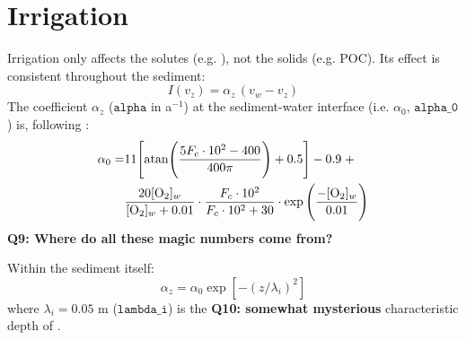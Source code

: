 \documentclass[a4paper]{article}
\newcommand{\code}[1]{\texttt{#1}}
\newcommand{\wtf}[1]{\textcolor{Cerulean}{\textbf{#1}}}
\begin{document}

\section{Irrigation}\label{sx:irrigation}

Irrigation only affects the solutes (e.g. ), not the solids (e.g. POC). Its effect is consistent throughout the sediment:
\begin{equation}
I(v_z) = \alpha_z \, (v_w - v_z)
\end{equation}
The coefficient $\alpha_z$ ($\code{alpha}$ in a$^{-1}$) at the sediment-water interface (i.e. $\alpha_0$, $\code{alpha\_0}$) is, following \citet{archer_model_2002}:
\begin{equation}
\begin{split}
\alpha_0 = & 11 \Bigg[ \mathrm{atan} \Bigg( \frac{5 F_c \cdot 10^2 - 400}{400 \pi} \Bigg) + 0.5 \Bigg] - 0.9 \; + \\
& \frac{20 [\ce{O2}]_w}{[\ce{O2}]_w + 0.01} \cdot \frac{F_c \cdot 10^2}{F_c \cdot 10^2 + 30} \cdot \exp \Bigg(\frac{-[\ce{O2}]_w}{0.01}\Bigg)
\end{split}
\end{equation}
\wtf{Q9: Where do all these magic numbers come from?}

Within the sediment itself:
\begin{equation}
\alpha_z = \alpha_0 \exp [-(z/\lambda_i)^2]
\end{equation}
where $\lambda_i = 0.05$ m ($\code{lambda\_i}$) is the \wtf{Q10: somewhat mysterious} characteristic depth of \citet{archer_model_2002}.


\end{document}
